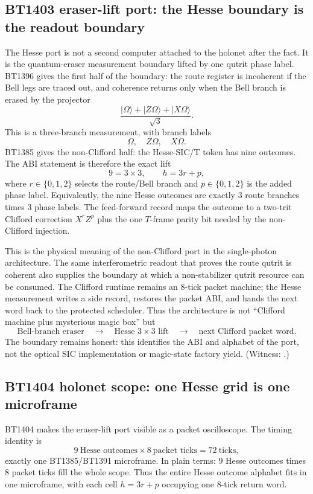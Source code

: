 \documentclass[11pt]{article}
\newcommand{\ket}[1]{|#1\rangle}
\begin{document}
\subsection{BT1403 eraser-lift port: the Hesse boundary is the readout boundary}

The Hesse port is not a second computer attached to the holonet after the fact.
It is the quantum-eraser measurement boundary lifted by one qutrit phase label.
BT1396 gives the first half of the boundary: the route register is incoherent if
the Bell legs are traced out, and coherence returns only when the Bell branch is
erased by the projector
\[
  \frac{\ket{\Omega}+\ket{Z\Omega}+\ket{X\Omega}}{\sqrt3}.
\]
This is a three-branch measurement, with branch labels
\[
  \Omega,\quad Z\Omega,\quad X\Omega .
\]
BT1385 gives the non-Clifford half: the Hesse-SIC/T token has nine outcomes.  The
ABI statement is therefore the exact lift
\[
  9 = 3\times 3,\qquad h=3r+p,
\]
where \(r\in\{0,1,2\}\) selects the route/Bell branch and
\(p\in\{0,1,2\}\) is the added phase label.  Equivalently, the nine Hesse
outcomes are exactly 3 route branches times 3 phase labels.  The feed-forward
record maps the outcome to a two-trit Clifford correction \(X^rZ^p\) plus the
one \(T\)-frame parity bit needed by the non-Clifford injection.

This is the physical meaning of the non-Clifford port in the single-photon
architecture.  The same interferometric readout that proves the route qutrit is
coherent also supplies the boundary at which a non-stabilizer qutrit resource can
be consumed.  The Clifford runtime remains an 8-tick packet machine; the Hesse
measurement writes a side record, restores the packet ABI, and hands the next
word back to the protected scheduler.  Thus the architecture is not
``Clifford machine plus mysterious magic box'' but
\[
  \text{Bell-branch eraser}\quad\longrightarrow\quad
  \text{Hesse }3\times3\text{ lift}\quad\longrightarrow\quad
  \text{next Clifford packet word}.
\]
The boundary remains honest: this identifies the ABI and alphabet of the port,
not the optical SIC implementation or magic-state factory yield.  (Witness:
.)

\subsection{BT1404 holonet scope: one Hesse grid is one microframe}

BT1404 makes the eraser-lift port visible as a packet oscilloscope.  The
timing identity is
\[
  9\ \text{Hesse outcomes}\times 8\ \text{packet ticks}=72\ \text{ticks},
\]
exactly one BT1385/BT1391 microframe.  In plain terms: 9 Hesse outcomes times
8 packet ticks fill the whole scope.  Thus the entire Hesse outcome alphabet
fits in one microframe, with each cell \(h=3r+p\) occupying one 8-tick return
word.
\end{document}
